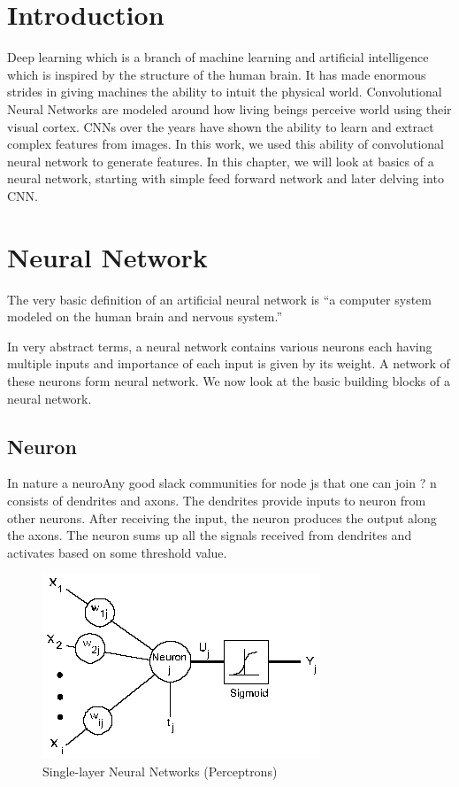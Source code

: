 \doublespacing
{} 
\label{chap:CNN}
\section{Introduction}
Deep learning which is a branch of machine learning and artificial intelligence which is  inspired by the structure of the human brain. It  has made enormous strides in giving machines the ability to intuit the physical world. Convolutional Neural Networks are modeled around how living beings perceive world using their visual cortex. CNNs over the years have shown the ability to learn and extract complex features from images. In this work, we used this ability of convolutional neural network to generate features. In this chapter, we will look at basics of a neural network, starting with simple feed forward network and later delving into CNN.


\section{Neural Network}

The very basic definition of an artificial neural network is “a computer system modeled on the human brain and nervous system.”
\par
In very abstract terms, a neural network contains various neurons each having multiple inputs and importance of each input is given by its weight. A network of these neurons form neural network. We now look at the basic building blocks of a neural network.

\subsection{Neuron}
In nature a neuroAny good slack communities for node js that one can join ?
n consists of dendrites and  axons. The dendrites provide inputs to neuron from other neurons. After receiving the input, the neuron produces the output along the axons. The neuron sums up all the signals received from dendrites and activates based on some threshold value. 

\begin{figure}[H]
  \centering
    \includegraphics[scale=.3, angle=0]{Files/nn2.png}
    \caption[Single-layer Neural Networks (Perceptrons)]{Single-layer Neural Networks (Perceptrons)}
    \label{fig:NNNN}
\end{figure}


